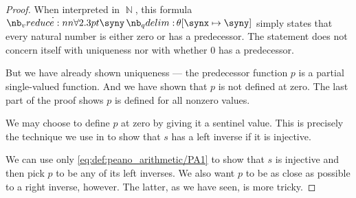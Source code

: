 \begin{proof}
  When interpreted in \( \BbbN \), this formula \( \qforall \syny \theta[\synx \mapsto \syny] \) simply states that every natural number is either zero or has a predecessor. The statement does not concern itself with uniqueness nor with whether \( 0 \) has a predecessor.

  But we have already shown uniqueness --- the predecessor function \( p \) is a partial single-valued function. And we have shown that \( p \) is not defined at zero. The last part of the proof shows \( p \) is defined for all nonzero values.

  We may choose to define \( p \) at zero by giving it a sentinel value. This is precisely the technique we use in  to show that \( s \) has a left inverse if it is injective.

  We can use only \eqref{eq:def:peano_arithmetic/PA1} to show that \( s \) is injective and then pick \( p \) to be any of its left inverses. We also want \( p \) to be as close as possible to a right inverse, however. The latter, as we have seen, is more tricky.
\end{proof}

